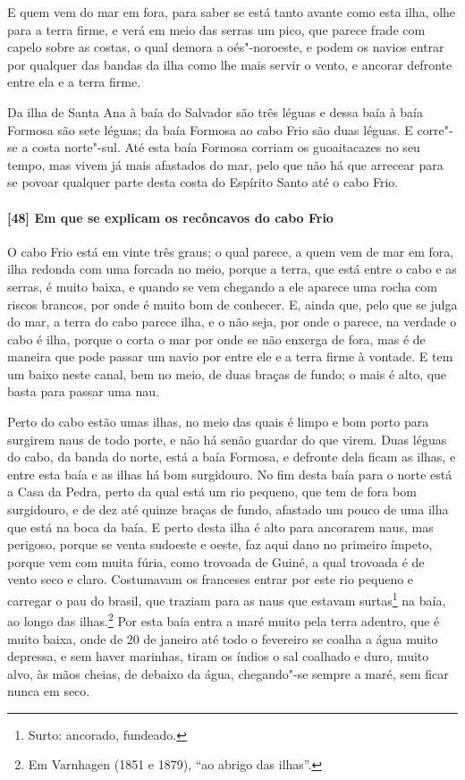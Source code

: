 E quem vem do mar em fora, para saber se está tanto avante como esta ilha, olhe para a
terra firme, e verá em meio das serras um pico, que parece frade com capelo sobre as
costas, o qual demora a oés"-noroeste, e podem os navios entrar por qualquer das bandas da
ilha como lhe mais servir o vento, e ancorar defronte entre ela e a terra firme.

Da ilha de Santa Ana à baía do Salvador são três léguas e dessa baía à baía Formosa são
sete léguas; da baía Formosa ao cabo Frio são duas léguas. E corre"-se a costa norte"-sul.
Até esta baía Formosa corriam os guoaitacazes no seu tempo, mas vivem já mais afastados do
mar, pelo que não há que arrecear para se povoar qualquer parte desta costa do Espírito
Santo até o cabo Frio.

\paragraph{[48] Em que se explicam os recôncavos do cabo Frio} \quad
O cabo Frio está em vinte três graus; o qual parece, a quem vem de mar em fora, ilha
redonda com uma forcada no meio, porque a terra, que está entre o cabo e as serras, é
muito baixa, e quando se vem chegando a ele aparece uma rocha com riscos brancos, por onde
é muito bom de conhecer. E, ainda que, pelo que se julga do mar, a terra do cabo parece
ilha, e o não seja, por onde o parece, na verdade o cabo é ilha, porque o corta o mar por
onde se não enxerga de fora, mas é de maneira que pode passar um navio por entre ele e a
terra firme à vontade. E tem um baixo neste canal, bem no meio, de duas braças de fundo; o
mais é alto, que basta para passar uma nau.

Perto do cabo estão umas ilhas, no meio das quais é limpo e bom porto para surgirem naus
de todo porte, e não há senão guardar do que virem. Duas léguas do cabo, da banda do
norte, está a baía Formosa, e defronte dela ficam as ilhas, e entre esta baía e as ilhas
há bom surgidouro. No fim desta baía para o norte está a Casa da Pedra, perto da qual está
um rio pequeno, que tem de fora bom surgidouro, e de dez até quinze braças de fundo,
afastado um pouco de uma ilha que está na boca da baía. E perto desta ilha é alto para
ancorarem naus, mas perigoso, porque se venta sudoeste e oeste, faz aqui dano no primeiro
ímpeto, porque vem com muita fúria, como trovoada de Guiné, a qual trovoada é de vento
seco e claro. Costumavam os franceses entrar por este rio pequeno e carregar o pau do
brasil, que traziam para as naus que estavam surtas\footnote{ Surto: ancorado, fundeado.}
na baía, ao longo das ilhas.\footnote{ Em Varnhagen (1851 e 1879), ``ao abrigo das
ilhas''.} Por esta baía entra a maré muito pela terra adentro, que é muito baixa, onde de
20 de janeiro até todo o fevereiro se coalha a água muito depressa, e sem haver marinhas,
tiram os índios o sal coalhado e duro, muito alvo, às mãos cheias, de debaixo da água,
chegando"-se sempre a maré, sem ficar nunca em seco.

